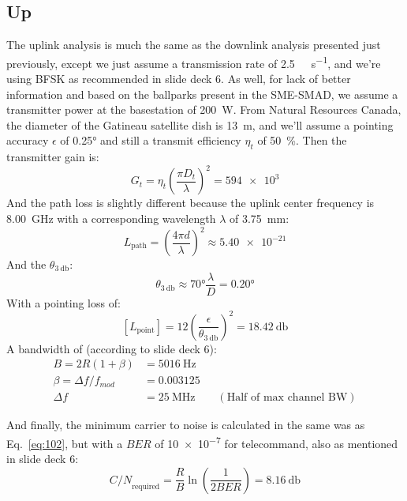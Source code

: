 \documentclass[9pt]{article}
\begin{document}
\subsection{Up}
The uplink analysis is much the same as the downlink analysis presented just previously, except we just assume a transmission rate of \qty{2.5}{\kilo\bit\per\second}, and we're using BFSK as recommended in slide deck 6.
As well, for lack of better information and based on the ballparks present in the SME-SMAD, we assume a transmitter power at the basestation of \qty{200}{\watt}.
From Natural Resources Canada, the diameter of the Gatineau satellite dish is \qty{13}{\meter}, and we'll assume a pointing accuracy $\epsilon$ of \ang{0.25} and still a transmit efficiency $\eta_t$ of \qty{50}{\percent}.
Then the transmitter gain is:
\begin{equation}\label{eq:200}
  G_t=\eta_t\left(\frac{\pi D_t}{\lambda}\right)^2=\num{594e3}
\end{equation}
And the path loss is slightly different because the uplink center frequency is \qty{8.00}{\giga\hertz} with a corresponding wavelength $\lambda$ of \qty{3.75}{\milli\meter}:
\begin{equation}\label{eq:203}
  L_\text{path}=\left(\frac{4\pi d}{\lambda}\right)^2\approx\num{5.40e-21}
\end{equation}
And the $\theta_{\qty{3}{\decibel}}$:
\begin{equation}
  \theta_{\qty{3}{\decibel}}\approx\ang{70}\frac{\lambda}{D}=\ang{0.20}
\end{equation}
With a pointing loss of:
\begin{equation}\label{eq:303}
  [L_\text{point}]=12\left(\frac{\epsilon}{\theta_{\qty{3}{\decibel}}}\right)^2=\qty{18.42}{\decibel}
\end{equation}
A bandwidth of (according to slide deck 6):
\begin{align}
  B =2R(1+\beta)&=\qty{5016}{\hertz}\\\label{eq:201}
  \beta =\Delta f/f_{mod}&=\num{0.003125}\\
  \Delta f&=\qty{25}{\mega\hertz}\qquad(\text{Half of max channel BW})
\end{align}

And finally, the minimum carrier to noise is calculated in the same was as Eq.~\ref{eq:102}, but with a ${BER}$ of \num{10e-7} for telecommand, also as mentioned in slide deck 6:
\begin{equation}\label{eq:202}
  {C/N}_\text{required}=\frac RB\ln\left(\frac{1}{2{BER}}\right)=\qty{8.16}{\decibel}
\end{equation}
\clearpage
\end{document}
